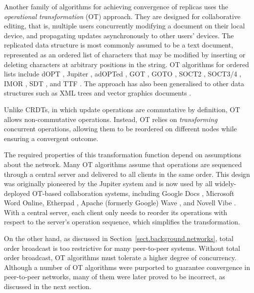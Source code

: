 Another family of algorithms for achieving convergence of replicas uses the \emph{operational
transformation} (OT) approach. They are designed for collaborative editing, that is, multiple users
concurrently modifying a document on their local device, and propagating updates asynchronously to
other users' devices. The replicated data structure is most commonly assumed to be a text document,
represented as an ordered list of characters that may be modified by inserting or deleting
characters at arbitrary positions in the string. OT algorithms for ordered lists include
dOPT \cite{Ellis:1989ue}, Jupiter \cite{Nichols:1995fd}, adOPTed \cite{Ressel:1996wx},
GOT \cite{Sun:1998un}, GOTO \cite{Sun:1998vf}, SOCT2 \cite{Suleiman:1997gl,Suleiman:1998eu},
SOCT3/4 \cite{Vidot:2000ch}, IMOR \cite{Imine:2003ks}, SDT \cite{Li:2004er,Li:2008hw}, and
TTF \cite{Oster:2006tr}.  The approach has also been generalised to other data structures such as
XML trees \cite{Ignat:2003jy,Davis:2002iv,Jungnickel:2015ua} and vector graphics documents
\cite{Sun:2002jb}.

Unlike CRDTs, in which update operations are commutative by definition, OT allows non-commutative
operations. Instead, OT relies on \emph{transforming} concurrent operations, allowing them to be
reordered on different nodes while ensuring a convergent outcome.

The required properties of this transformation function depend on assumptions about the network.
Many OT algorithms assume that operations are sequenced through a central server and delivered to
all clients in the same order. This design was originally pioneered by the Jupiter system
\cite{Nichols:1995fd} and is now used by all widely-deployed OT-based collaboration systems,
including Google Docs \cite{DayRichter:2010tt}, Microsoft Word Online, Etherpad
\cite{Etherpad:2011um}, Apache (formerly Google) Wave \cite{Wang:2015vo}, and Novell Vibe
\cite{Spiewak:2010vw}. With a central server, each client only needs to reorder its operations with
respect to the server's operation sequence, which simplifies the transformation.

On the other hand, as discussed in Section~\ref{sect.background.networks}, total order broadcast is
too restrictive for many peer-to-peer systems. Without total order broadcast, OT algorithms must
tolerate a higher degree of concurrency. Although a number of OT algorithms were purported to
guarantee convergence in peer-to-peer networks, many of them were later proved to be incorrect, as
discussed in the next section.

